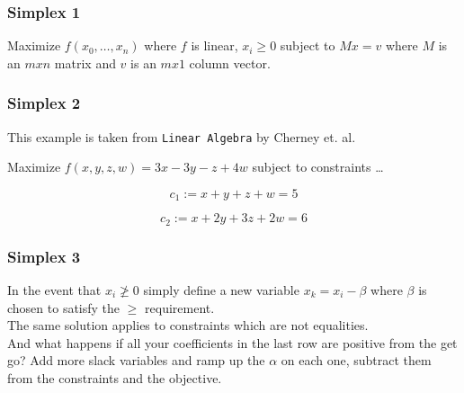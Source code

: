 \documentclass{beamer}
\begin{document}
\begin{frame}
\frametitle{Simplex 1}

    Maximize $f(x_{0},\ldots,x_{n})$ where $f$ is linear, $x_{i}\geq0$ subject
    to $Mx=v$ where $M$ is an $mxn$ matrix and $v$ is an $mx1$ column vector.

\end{frame}

\begin{frame}
\frametitle{Simplex 2}

    This example is taken from \texttt{Linear Algebra} by Cherney et. al.

    \hspace{2cm}

    Maximize $f(x,y,z,w) = 3x - 3y - z + 4w$ subject to constraints \ldots

    \hspace{2cm}

    \begin{equation}
    \label{c1}
        c_{1} := x + y + z + w = 5
    \end{equation}

    \begin{equation}
    \label{c2}
        c_{2} := x + 2y + 3z + 2w = 6 
    \end{equation}

\end{frame}
    
\begin{frame}
\frametitle{Simplex 3}

    In the event that $x_{i} \ngeq 0$ simply define a new variable $x_{k} = x_{i} - \beta$ where $\beta$ is chosen to satisfy the $\geq$ requirement.\\
    The same solution applies to constraints which are not equalities.\\
    And what happens if all your coefficients in the last row are positive from
    the get go? Add more slack variables and ramp up the $\alpha$ on each one,
    subtract them from the constraints and the objective.

\end{frame}
\end{document}

